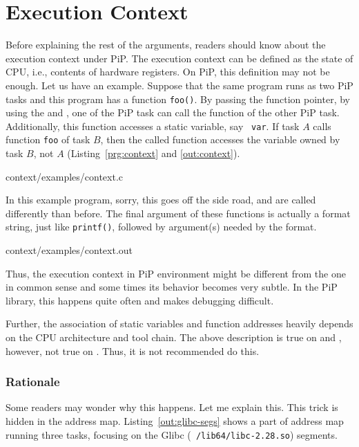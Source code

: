 
\section{Execution Context}\label{sec:context}

Before explaining the rest of the arguments, readers should know about
the execution context under PiP. The execution context can be defined
as the state of CPU, i.e., contents of hardware registers. On PiP,
this definition may not be enough. Let us have an example. Suppose
that the same program runs as two PiP tasks and this program has a
function {\tt foo()}. By passing the function pointer, by using the
 and , one of
the PiP task can call the function of the other PiP
task. Additionally, this function accesses a static variable, say {\tt
  var}. If task $A$ calls function {\tt foo} of task $B$, then the
called function accesses the variable owned by task $B$, not $A$
(Listing~\ref{prg:context} and \ref{out:context}).

 {context/examples/context.c}

In this example program, sorry, this goes off the side road,
 and 
 are called differently than
before. The final argument of these functions is actually a format
string, just like {\tt printf()}, followed by argument(s) needed by
the format. 


                {context/examples/context.out}

Thus, the execution context in PiP environment might be different from
the one in common sense and some times its behavior becomes very
subtle. In the PiP library, this happens quite often and makes
debugging difficult. 

Further, the association of static variables and function addresses
heavily depends on the CPU architecture and tool chain. The above
description is true on \AMD and \ARM,
however, not true on \INTEL. Thus, it is not recommended
do this. 

\subsubsection*{Rationale}

Some readers may wonder why this happens. Let me explain this. This
trick is hidden in the address map. Listing~\ref{out:glibc-segs} shows
a part of address map running three tasks, focusing on the Glibc ({\tt
  /lib64/libc-2.28.so}) segments. 

